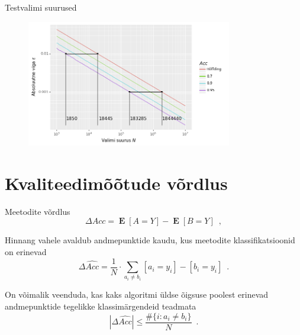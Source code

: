 \documentclass{beamer}
\DeclareMathOperator*{\MEAN}{\mathbf{E}}
\newcommand{\mean}[1]{\MEAN\left[#1\right]}
\newcommand{\accuracy}{Acc}
\begin{document}
\begin{frame}{Testvalimi suurused}
    \begin{figure}[H]
        \includegraphics[width=0.8\textwidth]{binoomjaotus_absoluutne_viga.png}
        \label{fig:binoomjaotus absoluutne viga}
    \end{figure}
\end{frame}

\section{Kvaliteedimõõtude võrdlus}

\begin{frame}{Meetodite võrdlus}
    \begin{equation*}
        \Delta \accuracy = \mean{A = Y} - \mean{B = Y} \enspace ,
    \end{equation*}

    Hinnang vahele avaldub andmepunktide kaudu, kus meetodite klassifikatsioonid on erinevad
    \begin{equation*}
        \Delta \widehat{\accuracy} = \frac{1}{N} \cdot \sum_{a_i \neq b_i} [a_i = y_i] - [b_i = y_i] \enspace .
    \end{equation*}

    On võimalik veenduda, kas kaks algoritmi üldse õigsuse poolest erinevad andmepunktide tegelikke klassimärgendeid teadmata
    \begin{equation*}
        \left| \Delta \widehat{\accuracy} \right| \leq \frac{\# \{ i : a_i \neq b_i \}}{N} \enspace .
    \end{equation*}
\end{frame}
\end{document}
